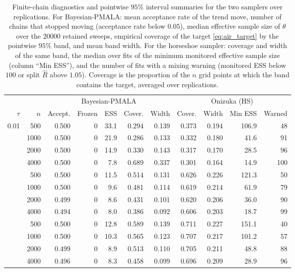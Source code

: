 \begin{table}[H]
\centering
\small
\setlength{\tabcolsep}{3pt}
\caption{Finite-chain diagnostics and pointwise $95\%$ interval summaries for the two samplers over replications. For Bayesian-PMALA: mean acceptance rate of the trend move, number of chains that stopped moving (acceptance rate below $0.05$), median effective sample size of $\theta$ over the $20000$ retained sweeps, empirical coverage of the target \eqref{eq:air_target} by the pointwise $95\%$ band, and mean band width. For the horseshoe sampler: coverage and width of the same band, the median over fits of the minimum monitored effective sample size (column ``Min ESS''), and the number of fits with a mixing warning (monitored ESS below $100$ or split $\widehat R$ above $1.05$). Coverage is the proportion of the $n$ grid points at which the band contains the target, averaged over replications.}
\label{tab:air_diagnostics}
\begin{tabular}{@{}rrrrrrrrrrr@{}}
\toprule
 & & \multicolumn{5}{c}{Bayesian-PMALA} & \multicolumn{4}{c}{Onizuka (HS)} \\
\cmidrule(lr){3-7}\cmidrule(lr){8-11}
$\tau$ & $n$ & Accept. & Frozen & ESS & Cover. & Width & Cover. & Width & Min ESS & Warned \\
\midrule
0.01 & 500 & 0.500 & 0 & 33.1 & 0.294 & 0.139 & 0.373 & 0.194 & 106.9 & 48 \\
 & 1000 & 0.500 & 0 & 21.9 & 0.286 & 0.133 & 0.332 & 0.180 & 41.6 & 91 \\
 & 2000 & 0.500 & 0 & 14.9 & 0.330 & 0.143 & 0.317 & 0.170 & 28.5 & 96 \\
 & 4000 & 0.500 & 0 & 7.8 & 0.689 & 0.337 & 0.301 & 0.164 & 14.9 & 100 \\
\addlinespace[3pt]
0.05 & 500 & 0.500 & 0 & 11.5 & 0.514 & 0.131 & 0.626 & 0.226 & 121.3 & 50 \\
 & 1000 & 0.500 & 0 & 9.6 & 0.481 & 0.114 & 0.619 & 0.214 & 61.9 & 79 \\
 & 2000 & 0.499 & 0 & 8.6 & 0.431 & 0.101 & 0.620 & 0.206 & 36.0 & 90 \\
 & 4000 & 0.494 & 0 & 8.0 & 0.386 & 0.092 & 0.606 & 0.203 & 18.7 & 99 \\
\addlinespace[3pt]
0.10 & 500 & 0.500 & 0 & 12.8 & 0.589 & 0.139 & 0.711 & 0.227 & 151.1 & 40 \\
 & 1000 & 0.500 & 0 & 10.3 & 0.565 & 0.123 & 0.707 & 0.217 & 101.2 & 57 \\
 & 2000 & 0.499 & 0 & 8.9 & 0.513 & 0.110 & 0.705 & 0.211 & 48.8 & 88 \\
 & 4000 & 0.496 & 0 & 8.3 & 0.458 & 0.099 & 0.696 & 0.209 & 28.9 & 96 \\
\bottomrule
\end{tabular}
\end{table}

